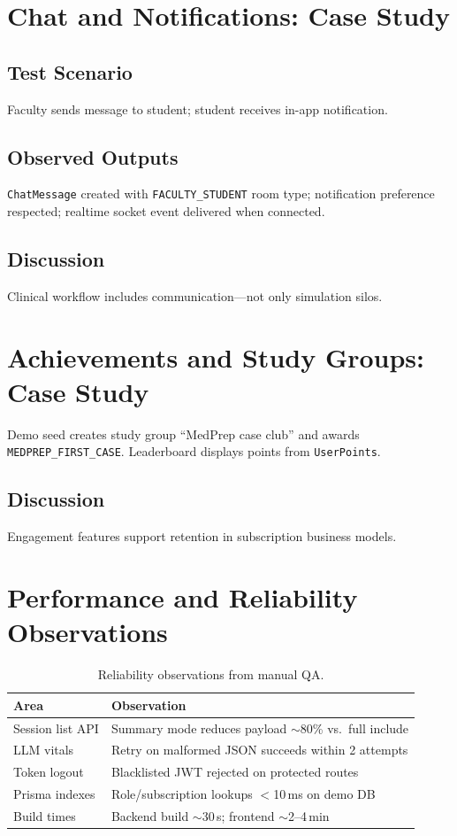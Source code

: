\section{Chat and Notifications: Case Study}
\subsection{Test Scenario}
Faculty sends message to student; student receives in-app notification.

\subsection{Observed Outputs}
\texttt{ChatMessage} created with \texttt{FACULTY\_STUDENT} room type; notification preference respected; realtime socket event delivered when connected.

\subsection{Discussion}
Clinical workflow includes communication---not only simulation silos.

\section{Achievements and Study Groups: Case Study}
Demo seed creates study group ``MedPrep case club'' and awards \texttt{MEDPREP\_FIRST\_CASE}. Leaderboard displays points from \texttt{UserPoints}.

\subsection{Discussion}
Engagement features support retention in subscription business models.

\section{Performance and Reliability Observations}
\begin{table}[htbp]
  \centering
  \caption{Reliability observations from manual QA.}
  \label{tab:reliability}
  \small
  \begin{tabular}{@{}p{4.5cm}p{8.5cm}@{}}
    \toprule
    \textbf{Area} & \textbf{Observation} \\
    \midrule
    Session list API & Summary mode reduces payload $\sim$80\% vs.\ full include \\
    LLM vitals & Retry on malformed JSON succeeds within 2 attempts \\
    Token logout & Blacklisted JWT rejected on protected routes \\
    Prisma indexes & Role/subscription lookups $<$10\,ms on demo DB \\
    Build times & Backend build $\sim$30\,s; frontend $\sim$2--4\,min \\
    \bottomrule
  \end{tabular}
\end{table}

